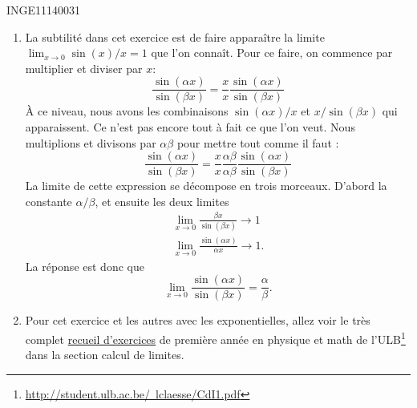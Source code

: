 \begin{corrige}{INGE11140031}
\begin{enumerate}
		\item
			La subtilité dans cet exercice est de faire apparaître la limite $\lim_{x\to 0} \sin(x)/x=1$ que l'on connaît. Pour ce faire, on commence par multiplier et diviser par $x$:
			\begin{equation}
				\frac{ \sin(\alpha x) }{ \sin(\beta x) }=\frac{ x }{ x } \frac{ \sin(\alpha x) }{ \sin(\beta x) }
			\end{equation}
			À ce niveau, nous avons les combinaisons $\sin(\alpha x)/x$ et $x/\sin(\beta x)$ qui apparaissent. Ce n'est pas encore tout à fait ce que l'on veut. Nous multiplions et divisons par $\alpha\beta$ pour mettre tout comme il faut :
			\begin{equation}
				\frac{ \sin(\alpha x) }{ \sin(\beta x) }=\frac{ x }{ x } \frac{ \alpha\beta }{ \alpha\beta }\frac{ \sin(\alpha x) }{ \sin(\beta x) }
			\end{equation}
			La limite de cette expression se décompose en trois morceaux. D'abord la constante $\alpha/\beta$, et ensuite les deux limites
			\begin{subequations}
				\begin{align}
					\lim_{x\to 0} \frac{ \beta x }{ \sin(\beta x) }\to 1\\
					\lim_{x\to 0} \frac{\sin(\alpha x)}{ \alpha x }\to 1.
				\end{align}
			\end{subequations}
			La réponse est donc que
			\begin{equation}
				\lim_{x\to 0} \frac{ \sin(\alpha x) }{ \sin(\beta x) }=\frac{ \alpha }{ \beta }.
			\end{equation}

		\item
			Pour cet exercice et les autres avec les exponentielles, allez voir le très complet \href{http://student.ulb.ac.be/~lclaesse/CdI1.pdf}{recueil d'exercices} de première année en physique et math de l'ULB\footnote{\href{http://student.ulb.ac.be/~lclaesse/CdI1.pdf}{http://student.ulb.ac.be/~lclaesse/CdI1.pdf}} dans la section \og calcul de limites\fg. 
		

\end{enumerate}
\end{corrige}
